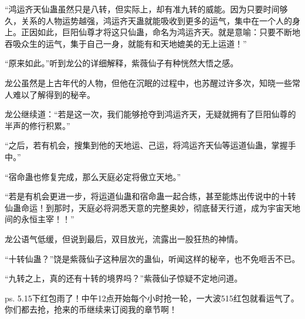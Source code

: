 \begin{this_body}
“鸿运齐天仙蛊虽然只是八转，但实际上，却有准九转的威能。因为只要时间够久，关系的人物运势越强，鸿运齐天蛊就能吸收到更多的运气，集中在一个人的身上。正因如此，巨阳仙尊才将这只仙蛊，命名为鸿运齐天。就是意喻：只要不断地吞吸众生的运气，集于自己一身，就能有和天地媲美的无上运道！”

“原来如此。”听到龙公的详细解释，紫薇仙子有种恍然大悟之感。

龙公虽然是上古年代的人物，但他在沉眠的过程中，也苏醒过许多次，知晓一些常人难以了解得到的秘辛。

龙公继续道：“若是这一次，我们能够抢夺到鸿运齐天，无疑就拥有了巨阳仙尊的半声的修行积累。”

“之后，若有机会，搜集到他的天地运、己运，将鸿运齐天仙等运道仙蛊，掌握手中。”

“宿命蛊也修复完成，那么天庭必定将傲立天地。”

“若是有机会更进一步，将运道仙蛊和宿命蛊一起合练，甚至能炼出传说中的十转仙蛊命运！到那时，天庭必将洞悉天意的完整奥妙，彻底替天行道，成为宇宙天地间的永恒主宰！！”

龙公语气低缓，但说到最后，双目放光，流露出一股狂热的神情。

“十转仙蛊？”饶是紫薇仙子这种层次的蛊仙，听闻这样的秘辛，也不免咂舌不已。

“九转之上，真的还有十转的境界吗？”紫薇仙子惊疑不定地问道。

ps. 5.15下红包雨了！中午12点开始每个小时抢一轮，一大波515红包就看运气了。你们都去抢，抢来的币继续来订阅我的章节啊！

\end{this_body}

